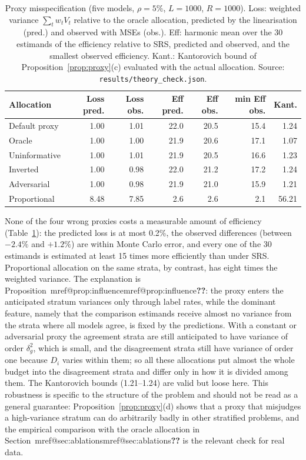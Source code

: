 \documentclass[pdflatex,sn-mathphys-num,iicol]{sn-jnl}
\makeatletter
\theoremstyle{thmstyleone}
\theoremstyle{thmstyletwo}
\theoremstyle{thmstylethree}
\newcommand{\Mref}[1]{\ifcsname mref@#1\endcsname\csname mref@#1\endcsname\else\textbf{??}\fi}
\makeatother
\begin{document}
\begin{table}[t]
\centering
\caption{Proxy misspecification (five models, $\rho=5\%$, $L=1000$, $R=1000$). Loss: weighted
variance $\sum_tw_tV_t$ relative to the oracle allocation, predicted by the linearisation (pred.) and
observed with MSEs (obs.). Eff: harmonic mean over the 30 estimands of the efficiency relative to
SRS, predicted and observed, and the smallest observed efficiency. Kant.: Kantorovich bound of
Proposition~\ref{prop:proxy}(c) evaluated with the actual allocation. Source:
\texttt{results/theory\_check.json}.}
\label{tab:sim-proxy}
\small
\begin{tabular}{lrrrrrr}
\toprule
Allocation & Loss pred. & Loss obs. & Eff pred. & Eff obs. & min Eff obs. & Kant.\\
\midrule
Default proxy & 1.00 & 1.01 & 22.0 & 20.5 & 15.4 & 1.24\\
Oracle & 1.00 & 1.00 & 21.9 & 20.6 & 17.1 & 1.07\\
Uninformative & 1.00 & 1.01 & 21.9 & 20.5 & 16.6 & 1.23\\
Inverted & 1.00 & 0.98 & 22.0 & 21.2 & 17.2 & 1.24\\
Adversarial & 1.00 & 0.98 & 21.9 & 21.0 & 15.9 & 1.21\\
Proportional & 8.48 & 7.85 & 2.6 & 2.6 & 2.1 & 56.21\\
\bottomrule
\end{tabular}
\end{table}

None of the four wrong proxies costs a measurable amount of efficiency (Table~\ref{tab:sim-proxy}):
the predicted loss is at most 0.2\%, the observed differences (between $-2.4\%$ and $+1.2\%$) are
within Monte Carlo error, and every one of the 30 estimands is estimated at least 15 times more
efficiently than under SRS. Proportional allocation on the same strata, by contrast, has eight times
the weighted variance. The explanation is Proposition~\Mref{prop:influence}: the proxy enters the
anticipated stratum variances only through label rates, while the dominant feature, namely that the
comparison estimands receive almost no variance from the strata where all models agree, is fixed by
the predictions. With a constant or adversarial proxy the agreement strata are still anticipated to
have variance of order $\delta_g^2$, which is small, and the disagreement strata still have variance
of order one because $D_i$ varies within them; so all these allocations put almost the whole budget
into the disagreement strata and differ only in how it is divided among them. The Kantorovich bounds
(1.21--1.24) are valid but loose here. This robustness is specific to the structure of the problem
and should not be read as a general guarantee: Proposition~\ref{prop:proxy}(d) shows that a proxy
that misjudges a high-variance stratum can do arbitrarily badly in other stratified problems, and the
empirical comparison with the oracle allocation in Section~\Mref{sec:ablations} is the relevant check
for real data.
\end{document}
